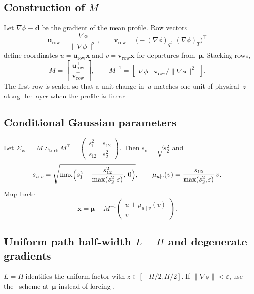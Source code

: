 \documentclass[11pt,a4paper]{article}
\begin{document}
\subsection{\texorpdfstring{Construction of $M$}{Construction of M}}
Let $\nabla\phi\equiv\mathbf{d}$ be the gradient of the mean profile.
Row vectors
\begin{equation}
  \mathbf{u}_{\mathrm{row}} = \frac{\nabla\phi}{\|\nabla\phi\|^2},\qquad
  \mathbf{v}_{\mathrm{row}} = \bigl(-(\nabla\phi)_q,\,(\nabla\phi)_T\bigr)^\top
\end{equation}
define coordinates $u=\mathbf{u}_{\mathrm{row}}\mathbf{x}$ and $v=\mathbf{v}_{\mathrm{row}}\mathbf{x}$ for departures from~$\boldsymbol{\mu}$.
Stacking rows,
\begin{equation}
  M = \begin{bmatrix} \mathbf{u}_{\mathrm{row}}^\top \\ \mathbf{v}_{\mathrm{row}}^\top \end{bmatrix},\qquad
  M^{-1} = \begin{bmatrix} \nabla\phi & \mathbf{v}_{\mathrm{row}}/\|\nabla\phi\|^2 \end{bmatrix}.
\end{equation}
The first row is scaled so that a unit change in~$u$ matches one unit of physical~$z$ along the layer when the profile is linear.

\subsection{Conditional Gaussian parameters}
Let $\Sigma_{uv}=M\,\Sigma_{\mathrm{turb}}\,M^\top=\left(\begin{smallmatrix}s_1^2&s_{12}\\ s_{12}&s_2^2\end{smallmatrix}\right)$.
Then $s_v=\sqrt{s_2^2}$ and
\begin{equation}
  s_{u\mid v} = \sqrt{\max\Bigl(s_1^2 - \frac{s_{12}^2}{\max(s_2^2,\varepsilon)},\,0\Bigr)},\qquad
  \mu_{u\mid v}(v) = \frac{s_{12}}{\max(s_2^2,\varepsilon)}\,v .
\end{equation}
Map back:
\begin{equation}
  \mathbf{x} = \boldsymbol{\mu} + M^{-1}\begin{pmatrix} u + \mu_{u\mid v}(v) \\ v \end{pmatrix}.
\end{equation}

\subsection{\texorpdfstring{Uniform path half-width $L=H$ and degenerate gradients}{Uniform path half-width L equals H}}
$L=H$ identifies the uniform factor with $z\in[-H/2,H/2]$.
If $\|\nabla\phi\|<\varepsilon$, use the \centeronly\ scheme at~$\boldsymbol{\mu}$ instead of forcing \profileros.
\end{document}
